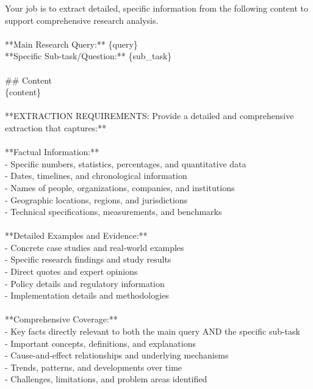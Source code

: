 \documentclass{article} %
\begin{document}
\begin{examplebox}
    \ttfamily
Your job is to extract detailed, specific information from the following content to support comprehensive research analysis.\\
\\
**Main Research Query:** \{query\} \\

**Specific Sub-task/Question:** \{sub\_task\}\\
\\
\#\# Content\\
\{content\}\\
\\
**EXTRACTION REQUIREMENTS: Provide a detailed and comprehensive extraction that captures:**\\
\\
**Factual Information:**\\
- Specific numbers, statistics, percentages, and quantitative data\\
- Dates, timelines, and chronological information\\
- Names of people, organizations, companies, and institutions\\
- Geographic locations, regions, and jurisdictions\\
- Technical specifications, measurements, and benchmarks\\
\\
**Detailed Examples and Evidence:**\\
- Concrete case studies and real-world examples\\
- Specific research findings and study results\\
- Direct quotes and expert opinions\\
- Policy details and regulatory information\\
- Implementation details and methodologies\\
\\
**Comprehensive Coverage:**\\
- Key facts directly relevant to both the main query AND the specific sub-task\\
- Important concepts, definitions, and explanations\\
- Cause-and-effect relationships and underlying mechanisms\\
- Trends, patterns, and developments over time\\
- Challenges, limitations, and problem areas identified\\

\end{examplebox}
\end{document}

